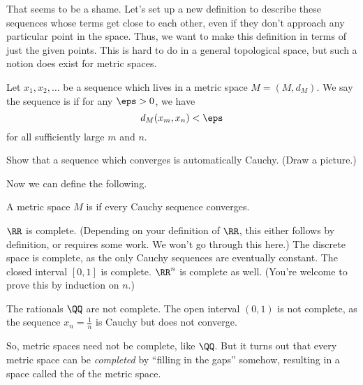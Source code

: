 That seems to be a shame.
Let's set up a new definition to describe these sequences whose terms
get close to each other,
even if they don't approach any particular point in the space.
Thus, we want to make this definition in terms of just the given points.
This is hard to do in a general topological space,
but such a notion does exist for metric spaces.

\begin{definition}
	Let $x_1, x_2, \dots$ be a sequence which lives in a metric space $M = (M,d_M)$.
	We say the sequence is  if for any $\eps > 0$, we have
	\[ d_M(x_m, x_n) < \eps \]
	for all sufficiently large $m$ and $n$.
\end{definition}

\begin{ques}
	Show that a sequence which converges is automatically Cauchy.
	(Draw a picture.)
\end{ques}

Now we can define the following.
\begin{definition}
	A metric space $M$ is  if every
	Cauchy sequence converges.
\end{definition}

\begin{example}
	\listhack
	\begin{enumerate}[(a)]
		\ii $\RR$ is complete. (Depending on your definition of $\RR$, this either follows
		by definition, or requires some work. We won't go through this here.)
		\ii The discrete space is complete, as the only Cauchy sequences are eventually constant.
		\ii The closed interval $[0,1]$ is complete.
		\ii $\RR^n$ is complete as well. (You're welcome to prove this by induction on $n$.)
	\end{enumerate}
\end{example}
\begin{example}
	\listhack
	\begin{enumerate}[(a)]
		\ii The rationals $\QQ$ are not complete.
		\ii The open interval $(0,1)$ is not complete, as the sequence $x_n = \frac 1n$
		is Cauchy but does not converge.
	\end{enumerate}
\end{example}

So, metric spaces need not be complete, like $\QQ$.
But it turns out that every metric space can be \emph{completed}
by ``filling in the gaps'' somehow, resulting in a space
called the  of the metric space.

